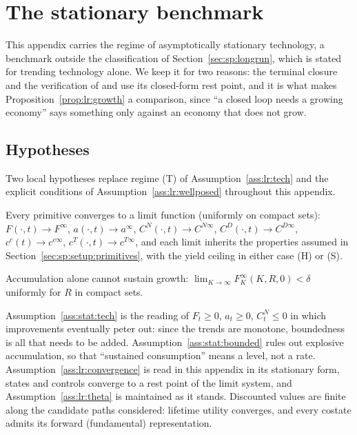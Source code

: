 \section{The stationary benchmark}\label{sec:app:stat}

This appendix carries the regime of asymptotically stationary technology, a benchmark outside the classification of Section~\ref{sec:sp:longrun}, which is stated for trending technology alone. We keep it for two reasons: the terminal closure and the verification of  and  use its closed-form rest point, and it is what makes Proposition~\ref{prop:lr:growth} a comparison, since ``a closed loop needs a growing economy'' says something only against an economy that does not grow.

\subsection{Hypotheses}\label{sec:app:stat:scope}

Two local hypotheses replace regime (T) of Assumption~\ref{ass:lr:tech} and the explicit conditions of Assumption~\ref{ass:lr:wellposed} throughout this appendix.

\begin{assumption}\label{ass:stat:tech}
Every primitive converges to a limit function (uniformly on compact sets): $F\left(\cdot,t\right)\to F^\infty$, $a\left(\cdot,t\right)\to a^\infty$, $C^N\left(\cdot,t\right)\to C^{N\infty}$, $C^D\left(\cdot,t\right)\to C^{D\infty}$, $c^c(t)\to c^{c\infty}$, $c^T\left(\cdot,t\right)\to c^{T\infty}$, and each limit inherits the properties assumed in Section~\ref{sec:sp:setup:primitives}, with the yield ceiling in either case (H) or (S).
\end{assumption}

\begin{assumption}\label{ass:stat:bounded}
Accumulation alone cannot sustain growth: $\lim_{K\to\infty}F^\infty_K\left(K,R,0\right)<\delta$ uniformly for $R$ in compact sets.
\end{assumption}

Assumption~\ref{ass:stat:tech} is the reading of $F_t\ge0$, $a_t\ge0$, $C^N_t\le0$ in which improvements eventually peter out: since the trends are monotone, boundedness is all that needs to be added. Assumption~\ref{ass:stat:bounded} rules out explosive accumulation, so that ``sustained consumption'' means a level, not a rate. Assumption~\ref{ass:lr:convergence} is read in this appendix in its stationary form, states and controls converge to a rest point of the limit system, and Assumption~\ref{ass:lr:theta} is maintained as it stands. Discounted values are finite along the candidate paths considered: lifetime utility converges, and every costate admits its forward (fundamental) representation.

